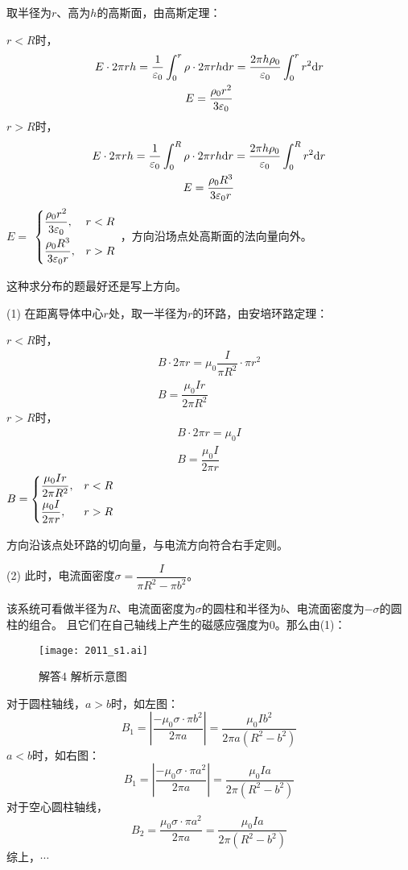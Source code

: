 取半径为$r$、高为$h$的高斯面，由高斯定理：

$r<R$时，
\begin{gather*}
E\cdot 2\pi rh=\dfrac{1}{\varepsilon_0}\int_0^r \rho\cdot 2\pi rh\mathrm{d}r=\dfrac{2\pi h\rho_0}{\varepsilon_0}\int_0^rr^2\mathrm{d}r\\
E=\dfrac{\rho_0r^2}{3\varepsilon_0}
\end{gather*}
$r>R$时，
\begin{gather*}
E\cdot 2\pi rh=\dfrac{1}{\varepsilon_0}\int_0^R \rho\cdot 2\pi rh\mathrm{d}r=\dfrac{2\pi h\rho_0}{\varepsilon_0}\int_0^Rr^2\mathrm{d}r\\
E=\dfrac{\rho_0R^3}{3\varepsilon_0r}
\end{gather*}
\therefore$E=$
$\begin{cases}
\vspace{0.3em}%
\dfrac{\rho_0r^2}{3\varepsilon_0},&r<R\\
\vspace{0.2em}
\dfrac{\rho_0R^3}{3\varepsilon_0r},&r>R
\end{cases}$
，方向沿场点处高斯面的法向量向外。

\note 这种求分布的题最好还是写上方向。

(1) 在距离导体中心$r$处，取一半径为$r$的环路，由安培环路定理：

$r<R$时，
\begin{gather*}
B\cdot 2\pi r=\mu_0\dfrac{I}{\pi R^2}\cdot\pi r^2\\
B=\dfrac{\mu_0Ir}{2\pi R^2}
\end{gather*}
$r>R$时，
\begin{gather*}
B\cdot 2\pi r=\mu_0I\\
B=\dfrac{\mu_0I}{2\pi r}
\end{gather*}
\therefore$B=
\begin{cases}
\vspace{0.3em}
\dfrac{\mu_0Ir}{2\pi R^2},&r<R\\
\vspace{0.2em}
\dfrac{\mu_0I}{2\pi r},&r>R
\end{cases}$

方向沿该点处环路的切向量，与电流方向符合右手定则。

(2) 此时，电流面密度$\sigma=\dfrac{I}{\pi R^2-\pi b^2}$。%

该系统可看做半径为$R$、电流面密度为$\sigma$的圆柱和半径为$b$、电流面密度为$-\sigma$的圆柱的组合。
且它们在自己轴线上产生的磁感应强度为0。那么由(1)：
\begin{figure}
	\centering
	\texttt{[image: 2011\_s1.ai]}
	\caption{解答4 解析示意图}
\end{figure}
对于圆柱轴线，$a>b$时，如左图：
\[
B_1=\left|\dfrac{-\mu_0\sigma\cdot\pi b^2}{2\pi a}\right|=\dfrac{\mu_0Ib^2}{2\pi a(R^2-b^2)}
\]
$a<b$时，如右图：
\[
B_1=\left|\dfrac{-\mu_0\sigma\cdot\pi a^2}{2\pi a}\right|=\dfrac{\mu_0Ia}{2\pi(R^2-b^2)}
\]
对于空心圆柱轴线，
\[
B_2=\dfrac{\mu_0\sigma\cdot\pi a^2}{2\pi a}=\dfrac{\mu_0Ia}{2\pi(R^2-b^2)}
\]
综上，$\cdots$

